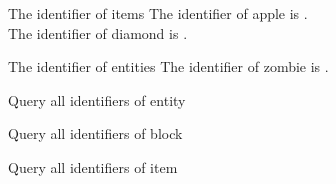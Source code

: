 
\begin{example}{The identifier of items}
    The identifier of apple is .\\
    The identifier of diamond is .
\end{example}

\begin{example}{The identifier of entities}
    The identifier of zombie is .
\end{example}

\label{ch:query_identifier}

\begin{example}{Query all identifiers of entity}
\end{example}

\begin{example}{Query all identifiers of block}
\end{example}

\begin{example}{Query all identifiers of item}
\end{example}
